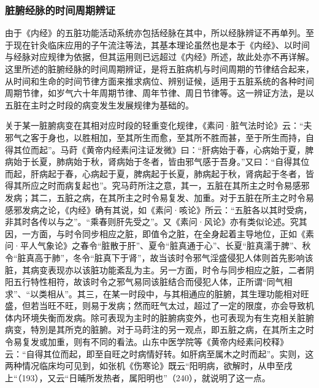 \documentclass[draft,12pt]{ctexbook}
\begin{document}
\subsubsection{脏腑经脉的时间周期辨证}%

由于《内经》的五脏功能活动系统亦包括经脉在其中，所以经脉辨证不再单列。至于现在针灸临床应用的子午流注等法，其基本理论虽然也是本于《内经》、以时间与经脉对应规律为依据，但其运用则已远超过《内经》所述，故此处亦不再详解。这里所述的脏腑经脉的时间周期辨证，是将五脏病机与时间周期的节律结合起来，从时间和生命的时间节律方面来推求病位、辨别证候，适用于五脏系统的各种时间周期节律，如岁气六十年周期节律、周年节律、周日节律等。这一辨证方法，是以五脏在主时之时段的病变发生发展规律为基础的。

关于某一脏腑病变在其相对应时段的轻重变化规律，《素问·脏气法时论》云：“夫邪气之客于身也，以胜相加，至其所生而愈，至其所不胜而甚，至于所生而持，自得其位而起”。马莳《黄帝内经素问注证发微》曰：“肝病始于春，心病始于夏，脾病始于长夏，肺病始于秋，肾病始于冬者，皆由邪气感于吾身。”又曰：“自得其位而起，肝病起于春，心病起于夏，脾病起于长夏，肺病起于秋，肾病起于冬者，皆得其所应之时而病复起也”。究马莳所注之意，其一，五脏在其所主之时令易感邪发病；其二，五脏之病，在其所主之时令易复发、加重。对于五脏在所主之时令易感邪发病之论，《内经》确有其说，如《素问·咳论》所云：“五脏各以其时受病，非其时各传以与之”。“乘春则肝先受之”。又《素问·风论》亦有类似论述。究其因，一方面，与时令同步相应之脏，即值令之脏，在全身起着主导地位，正如《素问·平人气象论》之春令“脏散于肝”、夏令“脏真通于心”、长夏“脏真濡于脾”、秋令“脏真高于肺”，冬令“脏真下于肾”，故当该时令邪气淫盛侵犯人体则首先影响该脏，其病变表现亦以该脏功能紊乱为主。另一方面，时令与同步相应之脏，二者阴阳五行特性相符，故该时令之邪气易同该脏结合而侵犯人体，正所谓“同气相求”、“以类相从”。其三，在某一时段中，与其相通应的脏腑，其生理功能相对旺盛，但若当旺不旺，则易于发病；然而旺气太过，超过了一定的限度，亦会导致机体内环境失衡而发病。除可表现为主时的脏腑病变外，也可表现为有生克相关脏腑病变，特別是其所克的脏腑。对于马莳注的另一观点，即五脏之病，在其所主之时令易复发或加重，则有不同的看法。山东中医学院等《黄帝内经素问校释》云：“自得其位而起，即至自旺之时病情好转。如肝病至属木之时而起”。实则，这两种情况临床均可见到，如张机《伤寒论》既云“阳明病，欲解时，从申至戌上“（193），又云“日晡所发热者，属阳明也”（240），就说明了这一点。
\end{document}
